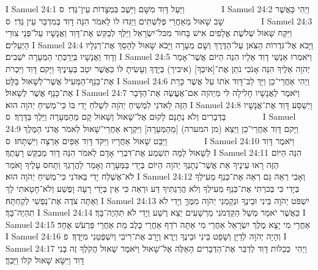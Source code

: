 I Samuel 24:1	וַיַּעַל דָּוִד מִשָּׁם וַיֵּשֶׁב בִּמְצָדוֹת עֵין־גֶּדִי׃ {ס}        
I Samuel 24:2	וַיְהִי כַּאֲשֶׁר שָׁב שָׁאוּל מֵאַחֲרֵי פְּלִשְׁתִּים וַיַּגִּדוּ לוֹ לֵאמֹר הִנֵּה דָוִד בְּמִדְבַּר עֵין גֶּדִי׃ {ס}        
I Samuel 24:3	וַיִּקַּח שָׁאוּל שְׁלֹשֶׁת אֲלָפִים אִישׁ בָּחוּר מִכּל־יִשְׂרָאֵל וַיֵּלֶךְ לְבַקֵּשׁ אֶת־דָּוִד וַאֲנָשָׁיו עַל־פְּנֵי צוּרֵי הַיְּעֵלִים׃
I Samuel 24:4	וַיָּבֹא אֶל־גִּדְרוֹת הַצֹּאן עַל־הַדֶּרֶךְ וְשָׁם מְעָרָה וַיָּבֹא שָׁאוּל לְהָסֵךְ אֶת־רַגְלָיו וְדָוִד וַאֲנָשָׁיו בְּיַרְכְּתֵי הַמְּעָרָה יֹשְׁבִים׃
I Samuel 24:5	וַיֹּאמְרוּ אַנְשֵׁי דָוִד אֵלָיו הִנֵּה הַיּוֹם אֲשֶׁר־אָמַר יְהֹוָה אֵלֶיךָ הִנֵּה אָנֹכִי נֹתֵן אֶת־[אֹיִבְךָ] (איביך) בְּיָדֶךָ וְעָשִׂיתָ לּוֹ כַּאֲשֶׁר יִטַב בְּעֵינֶיךָ וַיָּקם דָּוִד וַיִּכְרֹת אֶת־כְּנַף־הַמְּעִיל אֲשֶׁר־לְשָׁאוּל בַּלָּט׃
I Samuel 24:6	וַיְהִי אַחֲרֵי־כֵן וַיַּךְ לֵב־דָּוִד אֹתוֹ עַל אֲשֶׁר כָּרַת אֶת־כָּנָף אֲשֶׁר לְשָׁאוּל׃
I Samuel 24:7	וַיֹּאמֶר לַאֲנָשָׁיו חָלִילָה לִּי מֵיְהֹוָה אִם־אֶעֱשֶׂה אֶת־הַדָּבָר הַזֶּה לַאדֹנִי לִמְשִׁיחַ יְהֹוָה לִשְׁלֹחַ יָדִי בּוֹ כִּי־מְשִׁיחַ יְהֹוָה הוּא׃
I Samuel 24:8	וַיְשַׁסַּע דָּוִד אֶת־אֲנָשָׁיו בַּדְּבָרִים וְלֹא נְתָנָם לָקוּם אֶל־שָׁאוּל וְשָׁאוּל קָם מֵהַמְּעָרָה וַיֵּלֶךְ בַּדָּרֶךְ׃ {ס}        
I Samuel 24:9	וַיָּקם דָּוִד אַחֲרֵי־כֵן וַיֵּצֵא (מן המערה) [מֵהַמְּעָרָה] וַיִּקְרָא אַחֲרֵי־שָׁאוּל לֵאמֹר אֲדֹנִי הַמֶּלֶךְ וַיַּבֵּט שָׁאוּל אַחֲרָיו וַיִּקֹּד דָּוִד אַפַּיִם אַרְצָה וַיִּשְׁתָּחוּ׃ {ס}        
I Samuel 24:10	וַיֹּאמֶר דָּוִד לְשָׁאוּל לָמָּה תִשְׁמַע אֶת־דִּבְרֵי אָדָם לֵאמֹר הִנֵּה דָוִד מְבַקֵּשׁ רָעָתֶךָ׃
I Samuel 24:11	הִנֵּה הַיּוֹם הַזֶּה רָאוּ עֵינֶיךָ אֵת אֲשֶׁר־נְתָנְךָ יְהֹוָה  הַיּוֹם  בְּיָדִי בַּמְּעָרָה וְאָמַר לַהֲרָגְךָ וַתָּחס עָלֶיךָ וָאֹמַר לֹא־אֶשְׁלַח יָדִי בַּאדֹנִי כִּי־מְשִׁיחַ יְהֹוָה הוּא׃
I Samuel 24:12	וְאָבִי רְאֵה גַּם רְאֵה אֶת־כְּנַף מְעִילְךָ בְּיָדִי כִּי בְּכרְתִי אֶת־כְּנַף מְעִילְךָ וְלֹא הֲרַגְתִּיךָ דַּע וּרְאֵה כִּי אֵין בְּיָדִי רָעָה וָפֶשַׁע וְלֹא־חָטָאתִי לָךְ וְאַתָּה צֹדֶה אֶת־נַפְשִׁי לְקַחְתָּהּ׃
I Samuel 24:13	יִשְׁפֹּט יְהֹוָה בֵּינִי וּבֵינֶךָ וּנְקָמַנִי יְהֹוָה מִמֶּךָּ וְיָדִי לֹא תִהְיֶה־בָּךְ׃
I Samuel 24:14	כַּאֲשֶׁר יֹאמַר מְשַׁל הַקַּדְמֹנִי מֵרְשָׁעִים יֵצֵא רֶשַׁע וְיָדִי לֹא תִהְיֶה־בָּךְ׃
I Samuel 24:15	אַחֲרֵי מִי יָצָא מֶלֶךְ יִשְׂרָאֵל אַחֲרֵי מִי אַתָּה רֹדֵף אַחֲרֵי כֶּלֶב מֵת אַחֲרֵי פַּרְעֹשׁ אֶחָד׃
I Samuel 24:16	וְהָיָה יְהֹוָה לְדַיָּן וְשָׁפַט בֵּינִי וּבֵינֶךָ וְיֵרֶא וְיָרֵב אֶת־רִיבִי וְיִשְׁפְּטֵנִי מִיָּדֶךָ׃ {פ}
I Samuel 24:17	וַיְהִי  כְּכַלּוֹת דָּוִד לְדַבֵּר אֶת־הַדְּבָרִים הָאֵלֶּה אֶל־שָׁאוּל וַיֹּאמֶר שָׁאוּל הֲקֹלְךָ זֶה בְּנִי דָוִד וַיִּשָּׂא שָׁאוּל קֹלוֹ וַיֵּבְךְּ׃

